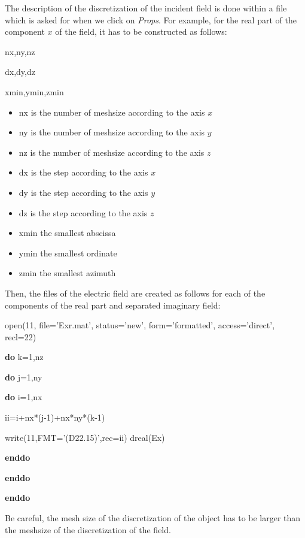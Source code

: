 The description of the discretization of the incident field is done 
within a file which is asked for when we click on {\it Props}.
For example, for the real part of the component $x$ of the field, 
it has to be constructed as follows:

nx,ny,nz 

dx,dy,dz

xmin,ymin,zmin

\begin{itemize}
\item  nx is the number of meshsize according to the axis $x$
\item  ny is the number of meshsize according to the axis $y$
\item  nz is the number of meshsize according to the axis $z$
\item  dx is the step according to the axis $x$
\item  dy is the step according to the axis $y$
\item  dz is the step according to the axis $z$
\item xmin the smallest abscissa
\item ymin the smallest ordinate
\item zmin the smallest azimuth
\end{itemize}

Then, the files of the electric field are created as follows for 
each of the components of the real part and separated imaginary field:

\vspace{10mm}

open(11, file='Exr.mat', status='new', form='formatted', access='direct', recl=22)

{\bf do} k=1,nz

\hspace{5mm} {\bf do} j=1,ny

\hspace{10mm} {\bf do} i=1,nx 

\hspace{15mm} ii=i+nx*(j-1)+nx*ny*(k-1)

\hspace{15mm} write(11,FMT='(D22.15)',rec=ii) dreal(Ex)

\hspace{10mm} {\bf enddo}

\hspace{5mm} {\bf enddo}

{\bf enddo}

\vspace{10mm}

Be careful, the mesh size of the discretization of the object has to
be larger than the meshsize of the discretization of the field.
